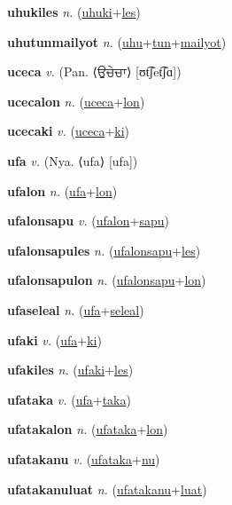\textbf{\hypertarget{uhukiles}{uhukiles}} \textit{n.} (\hyperlink{uhuki}{uhuki}+\allowbreak \hyperlink{les}{les})


\textbf{\hypertarget{uhutunmailyot}{uhutunmailyot}} \textit{n.} (\hyperlink{uhu}{uhu}+\allowbreak \hyperlink{tun}{tun}+\allowbreak \hyperlink{mailyot}{mailyot})


\textbf{\hypertarget{uceca}{uceca}} \textit{v.} (Pan. ⟨{\gurmukhi{}ਉਚੇਚਾ}⟩ [ʊt͡ʃet͡ʃɑ])


\textbf{\hypertarget{ucecalon}{ucecalon}} \textit{n.} (\hyperlink{uceca}{uceca}+\allowbreak \hyperlink{lon}{lon})


\textbf{\hypertarget{ucecaki}{ucecaki}} \textit{v.} (\hyperlink{uceca}{uceca}+\allowbreak \hyperlink{ki}{ki})


\textbf{\hypertarget{ufa}{ufa}} \textit{v.} (Nya. ⟨ufa⟩ [ufa])


\textbf{\hypertarget{ufalon}{ufalon}} \textit{n.} (\hyperlink{ufa}{ufa}+\allowbreak \hyperlink{lon}{lon})


\textbf{\hypertarget{ufalonsapu}{ufalonsapu}} \textit{v.} (\hyperlink{ufalon}{ufalon}+\allowbreak \hyperlink{sapu}{sapu})


\textbf{\hypertarget{ufalonsapules}{ufalonsapules}} \textit{n.} (\hyperlink{ufalonsapu}{ufalonsapu}+\allowbreak \hyperlink{les}{les})


\textbf{\hypertarget{ufalonsapulon}{ufalonsapulon}} \textit{n.} (\hyperlink{ufalonsapu}{ufalonsapu}+\allowbreak \hyperlink{lon}{lon})


\textbf{\hypertarget{ufaseleal}{ufaseleal}} \textit{n.} (\hyperlink{ufa}{ufa}+\allowbreak \hyperlink{seleal}{seleal})


\textbf{\hypertarget{ufaki}{ufaki}} \textit{v.} (\hyperlink{ufa}{ufa}+\allowbreak \hyperlink{ki}{ki})


\textbf{\hypertarget{ufakiles}{ufakiles}} \textit{n.} (\hyperlink{ufaki}{ufaki}+\allowbreak \hyperlink{les}{les})


\textbf{\hypertarget{ufataka}{ufataka}} \textit{v.} (\hyperlink{ufa}{ufa}+\allowbreak \hyperlink{taka}{taka})


\textbf{\hypertarget{ufatakalon}{ufatakalon}} \textit{n.} (\hyperlink{ufataka}{ufataka}+\allowbreak \hyperlink{lon}{lon})


\textbf{\hypertarget{ufatakanu}{ufatakanu}} \textit{v.} (\hyperlink{ufataka}{ufataka}+\allowbreak \hyperlink{nu}{nu})


\textbf{\hypertarget{ufatakanuluat}{ufatakanuluat}} \textit{n.} (\hyperlink{ufatakanu}{ufatakanu}+\allowbreak \hyperlink{luat}{luat})


